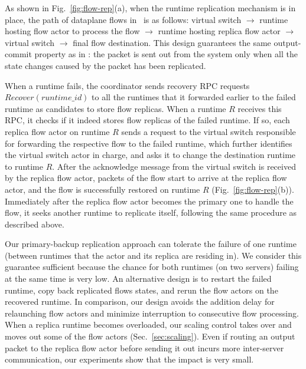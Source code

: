 As shown in Fig.~\ref{fig:flow-rep}(a), when the runtime replication mechanism is in place, the path of dataplane flows in \nfactor~is as follows: virtual switch $\rightarrow$ runtime hosting flow actor to process the flow $\rightarrow$ runtime hosting replica flow actor $\rightarrow$ virtual switch $\rightarrow$ final flow destination. This design guarantees the same output-commit property as in \cite{sherry2015rollback}: the packet is sent out from the system only when all the state changes caused by the packet has been replicated. %



When a runtime fails, the coordinator sends recovery RPC requests $Recover(runtime\_id) $ to all the runtimes that it forwarded earlier to the failed runtime as candidates to store flow replicas. When a runtime $R$ receives this RPC, it checks if it indeed stores flow replicas of the failed runtime. If so, each replica flow actor on runtime $R$ sends a request to the virtual switch responsible for forwarding the respective flow to the failed runtime, which further identifies the virtual switch actor in charge, and asks it to change the destination runtime to runtime $R$. After the acknowledge message from the virtual switch is received by the replica flow actor, packets of the flow start to arrive at the replica flow actor, and the flow is successfully restored on runtime $R$ (Fig.~\ref{fig:flow-rep}(b)). Immediately after the replica flow actor becomes the primary one to handle the flow, it seeks another runtime to replicate itself, following the same procedure as described above.


Our primary-backup replication approach can tolerate the failure of one runtime (between runtimes that the actor and its replica are residing in). We consider this guarantee sufficient because the
chance for both runtimes (on two servers) failing at the same time is very low. An alternative design is to restart the failed runtime, copy back replicated flows states, and rerun the flow actors on the recovered runtime. In comparison, our design avoids the addition delay for relaunching flow actors and minimize interruption to consecutive flow processing. When a replica runtime becomes overloaded, our scaling control takes over and moves out some of the flow actors (Sec.~\ref{sec:scaling}). Even if routing an output packet to the replica flow actor before sending it out incurs more inter-server communication, our experiments show that the impact is very small.


